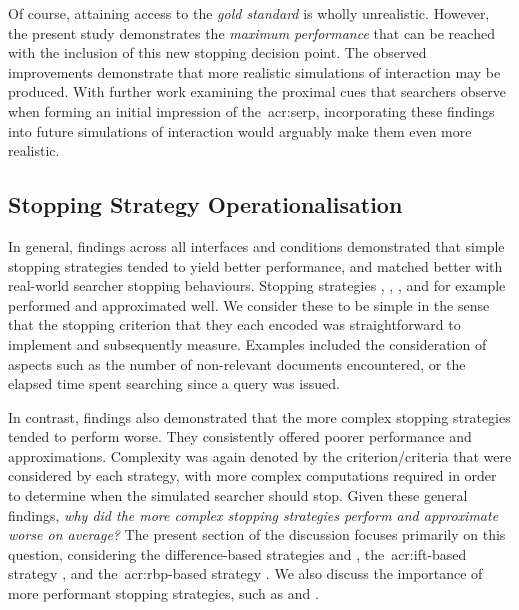 Of course, attaining access to the \emph{gold standard} is wholly unrealistic. However, the present study demonstrates the \emph{maximum performance} that can be reached with the inclusion of this new stopping decision point. The observed improvements demonstrate that more realistic simulations of interaction may be produced. With further work examining the proximal cues that searchers observe when forming an initial impression of the~\gls{acr:serp}, incorporating these findings into future simulations of interaction would arguably make them even more realistic.

\subsection{Stopping Strategy Operationalisation}\label{sec:conclusions:discussion:strategies}
In general, findings across all interfaces and conditions demonstrated that simple stopping strategies tended to yield better performance, and matched better with real-world searcher stopping behaviours. Stopping strategies , , ,  and  for example performed and approximated well. We consider these to be simple in the sense that the stopping criterion that they each encoded was straightforward to implement and subsequently measure. Examples included the consideration of aspects such as the number of non-relevant documents encountered, or the elapsed time spent searching since a query was issued.

In contrast, findings also demonstrated that the more complex stopping strategies tended to perform worse. They consistently offered poorer performance and approximations. Complexity was again denoted by the criterion/criteria that were considered by each strategy, with more complex computations required in order to determine when the simulated searcher should stop. Given these general findings, \emph{why did the more complex stopping strategies perform and approximate worse on average?} The present section of the discussion focuses primarily on this question, considering the difference-based strategies  and , the~\gls{acr:ift}-based strategy , and the~\gls{acr:rbp}-based strategy . We also discuss the importance of more performant stopping strategies, such as  and .

